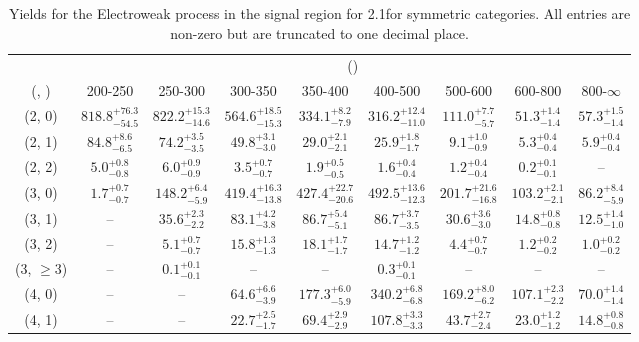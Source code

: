 \begin{table}[h!]
\tiny
\centering
\caption{Yields for the Electroweak process in the signal region for 2.1\ifb for symmetric categories. All entries are non-zero but are truncated to one decimal place.\label{tab:yieldssep_sig_ewk_sym}}
\begin{tabular}
{ccccccccc}
	\hline\hline
	& \multicolumn{8}{c}{\scalht (\gev)} \\ 
	 (\njet,  \nb) & 200-250 & 250-300 & 300-350 & 350-400 & 400-500 & 500-600 & 600-800 & 800-$\infty$ \\ [0.8ex] 
\hline
	(2, 0) & $818.8^{+ 76.3 }_{- 54.5 }$ & $822.2^{+ 15.3 }_{- 14.6 }$ & $564.6^{+ 18.5 }_{- 15.3 }$ & $334.1^{+ 8.2 }_{- 7.9 }$ & $316.2^{+ 12.4 }_{- 11.0 }$ & $111.0^{+ 7.7 }_{- 5.7 }$ & $51.3^{+ 1.4 }_{- 1.4 }$ & $57.3^{+ 1.5 }_{- 1.4 }$ \\[0.5ex] 
	(2, 1) & $84.8^{+ 8.6 }_{- 6.5 }$ & $74.2^{+ 3.5 }_{- 3.5 }$ & $49.8^{+ 3.1 }_{- 3.0 }$ & $29.0^{+ 2.1 }_{- 2.1 }$ & $25.9^{+ 1.8 }_{- 1.7 }$ & $9.1^{+ 1.0 }_{- 0.9 }$ & $5.3^{+ 0.4 }_{- 0.4 }$ & $5.9^{+ 0.4 }_{- 0.4 }$ \\[0.5ex] 
	(2, 2) & $5.0^{+ 0.8 }_{- 0.8 }$ & $6.0^{+ 0.9 }_{- 0.9 }$ & $3.5^{+ 0.7 }_{- 0.7 }$ & $1.9^{+ 0.5 }_{- 0.5 }$ & $1.6^{+ 0.4 }_{- 0.4 }$ & $1.2^{+ 0.4 }_{- 0.4 }$ & $0.2^{+ 0.1 }_{- 0.1 }$ & -- \\[0.5ex] 
	(3, 0) & $1.7^{+ 0.7 }_{- 0.7 }$ & $148.2^{+ 6.4 }_{- 5.9 }$ & $419.4^{+ 16.3 }_{- 13.8 }$ & $427.4^{+ 22.7 }_{- 20.6 }$ & $492.5^{+ 13.6 }_{- 12.3 }$ & $201.7^{+ 21.6 }_{- 16.8 }$ & $103.2^{+ 2.1 }_{- 2.1 }$ & $86.2^{+ 8.4 }_{- 5.9 }$ \\[0.5ex] 
	(3, 1) & -- & $35.6^{+ 2.3 }_{- 2.2 }$ & $83.1^{+ 4.2 }_{- 3.8 }$ & $86.7^{+ 5.4 }_{- 5.1 }$ & $86.7^{+ 3.7 }_{- 3.5 }$ & $30.6^{+ 3.6 }_{- 3.0 }$ & $14.8^{+ 0.8 }_{- 0.8 }$ & $12.5^{+ 1.4 }_{- 1.0 }$ \\[0.5ex] 
	(3, 2) & -- & $5.1^{+ 0.7 }_{- 0.7 }$ & $15.8^{+ 1.3 }_{- 1.3 }$ & $18.1^{+ 1.7 }_{- 1.7 }$ & $14.7^{+ 1.2 }_{- 1.2 }$ & $4.4^{+ 0.7 }_{- 0.7 }$ & $1.2^{+ 0.2 }_{- 0.2 }$ & $1.0^{+ 0.2 }_{- 0.2 }$ \\[0.5ex] 
	(3, $\ge3$) & -- & $0.1^{+ 0.1 }_{- 0.1 }$ & -- & -- & $0.3^{+ 0.1 }_{- 0.1 }$ & -- & -- & -- \\[0.5ex] 
	(4, 0) & -- & -- & $64.6^{+ 6.6 }_{- 3.9 }$ & $177.3^{+ 6.0 }_{- 5.9 }$ & $340.2^{+ 6.8 }_{- 6.8 }$ & $169.2^{+ 8.0 }_{- 6.2 }$ & $107.1^{+ 2.3 }_{- 2.2 }$ & $70.0^{+ 1.4 }_{- 1.4 }$ \\[0.5ex] 
	(4, 1) & -- & -- & $22.7^{+ 2.5 }_{- 1.7 }$ & $69.4^{+ 2.9 }_{- 2.9 }$ & $107.8^{+ 3.3 }_{- 3.3 }$ & $43.7^{+ 2.7 }_{- 2.4 }$ & $23.0^{+ 1.2 }_{- 1.2 }$ & $14.8^{+ 0.8 }_{- 0.8 }$ \\[0.5ex] 

\end{tabular}
\end{table}
